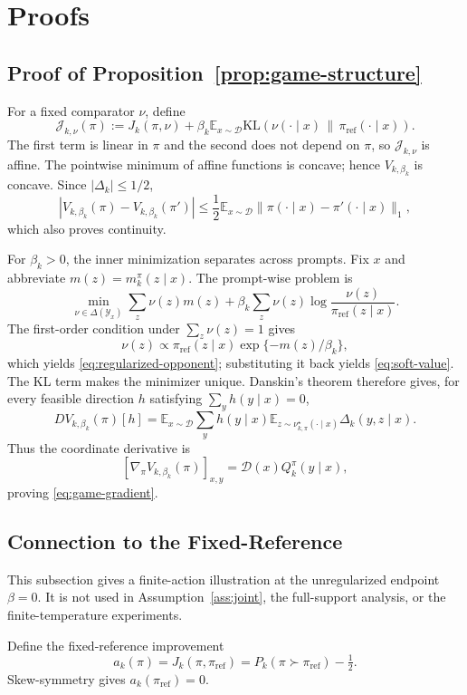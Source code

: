 \documentclass{article}
\theoremstyle{remark}
\theoremstyle{plain}
\newcommand{\Y}{\mathcal{Y}}
\newcommand{\KL}{\mathrm{KL}}
\newcommand{\E}{\mathbb{E}}
\newcommand{\D}{\mathcal{D}}
\newcommand{\piref}{\pi_{\mathrm{ref}}}
\begin{document}
\appendix

\section{Proofs}
\label{app:proofs}

\subsection{Proof of Proposition~\ref{prop:game-structure}}
\label{app:proof-game-structure}
For a fixed comparator $\nu$, define
\[
\mathcal J_{k,\nu}(\pi)
:=
J_k(\pi,\nu)
+
\beta_k\E_{x\sim\D}
\KL\!\left(\nu(\cdot\mid x)\,\|\,\piref(\cdot\mid x)\right).
\]
The first term is linear in $\pi$ and the second does not depend on $\pi$, so $\mathcal J_{k,\nu}$ is affine. The pointwise minimum of affine functions is concave; hence $V_{k,\beta_k}$ is concave. Since $|\Delta_k|\le1/2$,
\[
|V_{k,\beta_k}(\pi)-V_{k,\beta_k}(\pi')|
\le
\frac12\E_{x\sim\D}
\|\pi(\cdot\mid x)-\pi'(\cdot\mid x)\|_1,
\]
which also proves continuity.

For $\beta_k>0$, the inner minimization separates across prompts. Fix $x$ and abbreviate $m(z)=m_k^\pi(z\mid x)$. The prompt-wise problem is
\[
\min_{\nu\in\Delta(\Y_x)}
\sum_z\nu(z)m(z)
+
\beta_k\sum_z\nu(z)
\log\frac{\nu(z)}{\piref(z\mid x)}.
\]
The first-order condition under $\sum_z\nu(z)=1$ gives
\[
\nu(z)\propto\piref(z\mid x)\exp\{-m(z)/\beta_k\},
\]
which yields \eqref{eq:regularized-opponent}; substituting it back yields \eqref{eq:soft-value}. The KL term makes the minimizer unique. Danskin's theorem therefore gives, for every feasible direction $h$ satisfying $\sum_yh(y\mid x)=0$,
\[
D V_{k,\beta_k}(\pi)[h]
=
\E_{x\sim\D}\sum_y h(y\mid x)
\E_{z\sim\nu^\star_{k,\pi}(\cdot\mid x)}
\Delta_k(y,z\mid x).
\]
Thus the coordinate derivative is
\[
\left[\nabla_\pi V_{k,\beta_k}(\pi)\right]_{x,y}
=
\D(x)Q_k^\pi(y\mid x),
\]
proving \eqref{eq:game-gradient}.

\subsection{Connection to the Fixed-Reference}
\label{app:anchor-limit}
This subsection gives a finite-action illustration at the unregularized endpoint $\beta=0$. It is not used in Assumption~\ref{ass:joint}, the full-support analysis, or the finite-temperature experiments.

Define the fixed-reference improvement
\begin{equation}
a_k(\pi)=J_k(\pi,\piref)=P_k(\pi\succ\piref)-\tfrac12.
\label{eq:anchor-margin}
\end{equation}
Skew-symmetry gives $a_k(\piref)=0$.
\end{document}
